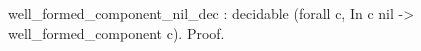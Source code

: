 well_formed_component_nil_dec : 
  decidable (forall c, In c nil -> well_formed_component c).
Proof.
